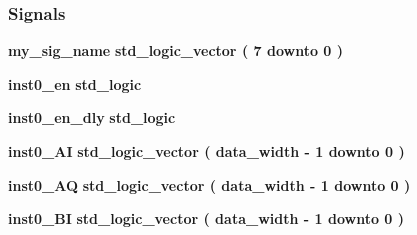 \subsubsection*{Signals}
 \begin{DoxyCompactItemize}
\item 
{\bf my\+\_\+sig\+\_\+name} {\bfseries \textcolor{comment}{std\+\_\+logic\+\_\+vector}\textcolor{vhdlchar}{ }\textcolor{vhdlchar}{(}\textcolor{vhdlchar}{ }\textcolor{vhdlchar}{ } \textcolor{vhdldigit}{7} \textcolor{vhdlchar}{ }\textcolor{keywordflow}{downto}\textcolor{vhdlchar}{ }\textcolor{vhdlchar}{ } \textcolor{vhdldigit}{0} \textcolor{vhdlchar}{ }\textcolor{vhdlchar}{)}\textcolor{vhdlchar}{ }} 
\item 
{\bf inst0\+\_\+en} {\bfseries \textcolor{comment}{std\+\_\+logic}\textcolor{vhdlchar}{ }} 
\item 
{\bf inst0\+\_\+en\+\_\+dly} {\bfseries \textcolor{comment}{std\+\_\+logic}\textcolor{vhdlchar}{ }} 
\item 
{\bf inst0\+\_\+\+AI} {\bfseries \textcolor{comment}{std\+\_\+logic\+\_\+vector}\textcolor{vhdlchar}{ }\textcolor{vhdlchar}{(}\textcolor{vhdlchar}{ }\textcolor{vhdlchar}{ }\textcolor{vhdlchar}{ }\textcolor{vhdlchar}{ }{\bfseries {\bf data\+\_\+width}} \textcolor{vhdlchar}{-\/}\textcolor{vhdlchar}{ } \textcolor{vhdldigit}{1} \textcolor{vhdlchar}{ }\textcolor{keywordflow}{downto}\textcolor{vhdlchar}{ }\textcolor{vhdlchar}{ } \textcolor{vhdldigit}{0} \textcolor{vhdlchar}{ }\textcolor{vhdlchar}{)}\textcolor{vhdlchar}{ }} 
\item 
{\bf inst0\+\_\+\+AQ} {\bfseries \textcolor{comment}{std\+\_\+logic\+\_\+vector}\textcolor{vhdlchar}{ }\textcolor{vhdlchar}{(}\textcolor{vhdlchar}{ }\textcolor{vhdlchar}{ }\textcolor{vhdlchar}{ }\textcolor{vhdlchar}{ }{\bfseries {\bf data\+\_\+width}} \textcolor{vhdlchar}{-\/}\textcolor{vhdlchar}{ } \textcolor{vhdldigit}{1} \textcolor{vhdlchar}{ }\textcolor{keywordflow}{downto}\textcolor{vhdlchar}{ }\textcolor{vhdlchar}{ } \textcolor{vhdldigit}{0} \textcolor{vhdlchar}{ }\textcolor{vhdlchar}{)}\textcolor{vhdlchar}{ }} 
\item 
{\bf inst0\+\_\+\+BI} {\bfseries \textcolor{comment}{std\+\_\+logic\+\_\+vector}\textcolor{vhdlchar}{ }\textcolor{vhdlchar}{(}\textcolor{vhdlchar}{ }\textcolor{vhdlchar}{ }\textcolor{vhdlchar}{ }\textcolor{vhdlchar}{ }{\bfseries {\bf data\+\_\+width}} \textcolor{vhdlchar}{-\/}\textcolor{vhdlchar}{ } \textcolor{vhdldigit}{1} \textcolor{vhdlchar}{ }\textcolor{keywordflow}{downto}\textcolor{vhdlchar}{ }\textcolor{vhdlchar}{ } \textcolor{vhdldigit}{0} \textcolor{vhdlchar}{ }\textcolor{vhdlchar}{)}\textcolor{vhdlchar}{ }} 

\end{DoxyCompactItemize}
